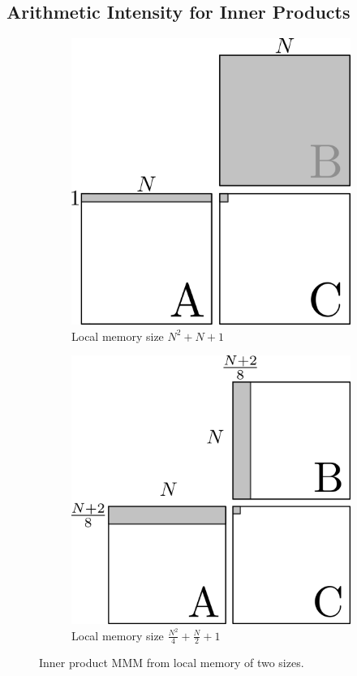 \documentclass[a4 paper]{article}
\begin{document}
\subsection*{Arithmetic Intensity for Inner Products}
\begin{figure}[H]
\centering
\begin{subfigure}{.5\textwidth}
  \centering
  \includegraphics[scale=1]{figures/inner_mmm_n2.png}
  \caption{Local memory size $N^2 + N + 1$}
  \label{fig:innermm_n2}
\end{subfigure}%
\begin{subfigure}{.5\textwidth}
  \centering
  \includegraphics[scale=1]{figures/inner_mmm_n2_4.png}
  \caption{Local memory size  $\frac{N^2}{4} + \frac{N}{2} + 1$}
  \label{fig:innermm_n2_4}
\end{subfigure}
\caption{Inner product MMM from local memory of two sizes.}
\label{fig:innermm}
\end{figure}
\end{document}
